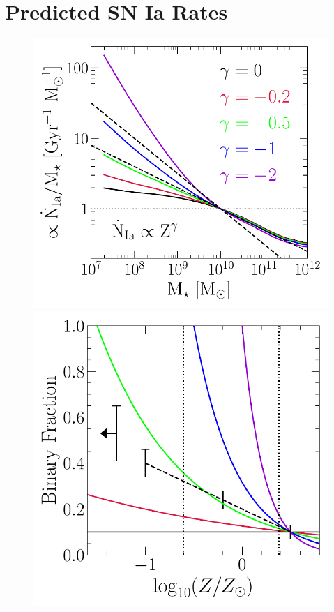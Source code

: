 \documentclass[foo.tex]{subfiles}
\begin{document}
\section{Predicted SN Ia Rates}
\label{sec:predictions}

\begin{figure}
\centering
\includegraphics[scale = 0.60]{umachine_iarate_metdep.pdf}
\includegraphics[scale = 0.61]{binaries_zscaling.pdf}

\end{figure}
\end{document}
